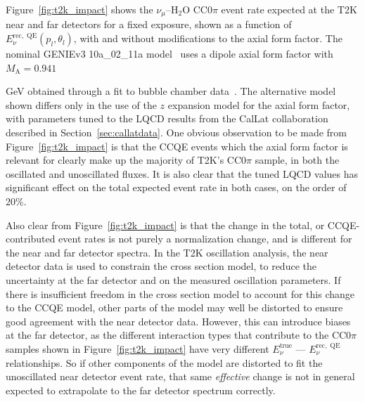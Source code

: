 \documentclass{ar-1col}
\begin{document}
Figure~\ref{fig:t2k_impact} shows the $\nu_{\mu}$--H$_{2}$O CC0$\pi$ event rate expected at the T2K near and far detectors for a fixed exposure, shown as a function of $E^{\mathrm{rec,\;QE}}_{\nu}\left(p_{l}, \theta_{l}\right)$, with and without modifications to the axial form factor. The nominal GENIEv3 10a\_02\_11a model~\cite{Andreopoulos:2009rq, GENIE:2021npt} uses a dipole axial form factor with $M_{\mathrm{A}} = 0.941$%
\begin{marginnote}
\end{marginnote}%
 GeV obtained through a fit to bubble chamber data~\cite{GENIE:2021zuu}. The alternative model shown differs only in the use of the $z$ expansion model for the axial form factor, with parameters tuned to the LQCD results from the CalLat collaboration described in Section~\ref{sec:callatdata}. One obvious observation to be made from Figure~\ref{fig:t2k_impact} is that the CCQE events which the axial form factor is relevant for clearly make up the majority of T2K's CC0$\pi$ sample, in both the oscillated and unoscillated fluxes. It is also clear that the tuned LQCD values has significant effect on the total expected event rate in both cases, on the order of 20\%.

Also clear from Figure~\ref{fig:t2k_impact} is that the change in the total, or CCQE-contributed event rates is not purely a normalization change, and is different for the near and far detector spectra. In the T2K oscillation analysis, the near detector data is used to constrain the cross section model, to reduce the uncertainty at the far detector and on the measured oscillation parameters. If there is insufficient freedom in the cross section model to account for this change to the CCQE model, other parts of the model may well be distorted to ensure good agreement with the near detector data. However, this can introduce biases at the far detector, as the different interaction types that contribute to the CC0$\pi$ samples shown in Figure~\ref{fig:t2k_impact} have very different $E_{\nu}^{\mathrm{true}}$ --- $E^{\mathrm{rec,\;QE}}_{\nu}$ relationships. So if other components of the model are distorted to fit the unoscillated near detector event rate, that same {\it effective} change is not in general expected to extrapolate to the far detector spectrum correctly.
\end{document}

